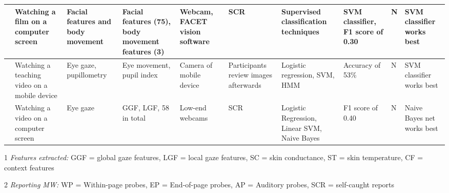 \begin{landscape}
\begin{xtabular}{p{25mm}p{28mm}p{30mm}p{22mm}p{38mm}p{22mm}p{23mm}p{22mm}p{15mm}p{3cm}}
\cite{Stewart2016WheresViewing} & Watching a film on a computer screen & Facial features and body movement & Facial features (75), body movement features (3) & Webcam, FACET vision software & SCR & Supervised classification techniques & SVM classifier, F1 score of 0.30 & N & SVM classifier works best\\ \midrule 
\cite{ISI:000443429900018} & Watching a teaching video on a mobile device & Eye gaze, pupillometry & Eye movement, pupil index & Camera of mobile device & Participants review images afterwards & Logistic regression, SVM, HMM & Accuracy of 53\% & N & SVM classifier works best\\ \midrule 
\cite{Zhao2017ScalableApproach} & Watching a video on a computer screen & Eye gaze & GGF, LGF, 58 in total & Low-end webcams & SCR & Logistic Regression, Linear SVM, Naive Bayes & F1 score of 0.40 & N & Naive Bayes net works best\\ \midrule
\bottomrule
\end{xtabular} %

\begin{ThreePartTable}
        \begin{tablenotes}
        \small
        \item[1] \emph{Features extracted:} GGF = global gaze features, LGF = local gaze features, SC = skin conductance, ST = skin temperature, CF = context features
        \item[2] \emph{Reporting MW:} WP = Within-page probes, EP = End-of-page probes, AP = Auditory probes, SCR = self-caught reports
        \end{tablenotes}
\end{ThreePartTable}
\end{landscape}  %
\restoregeometry %
\twocolumn       %